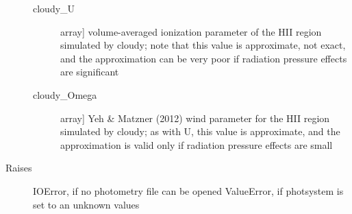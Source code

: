 \documentclass[letterpaper,10pt,english]{sphinxmanual}
\begin{document}
\begin{fulllineitems}
\begin{description}
\begin{description}
\item[{cloudy\_U}] \leavevmode{[}array{]}
volume-averaged ionization parameter of the HII region
simulated by cloudy; note that this value is approximate,
not exact, and the approximation can be very poor if
radiation pressure effects are significant

\item[{cloudy\_Omega}] \leavevmode{[}array{]}
Yeh \& Matzner (2012) wind parameter for the HII region
simulated by cloudy; as with U, this value is approximate,
and the approximation is valid only if radiation pressure
effects are small

\end{description}

\item[{Raises}] \leavevmode
IOError, if no photometry file can be opened
ValueError, if photsystem is set to an unknown values

\end{description}

\end{fulllineitems}

\end{document}
